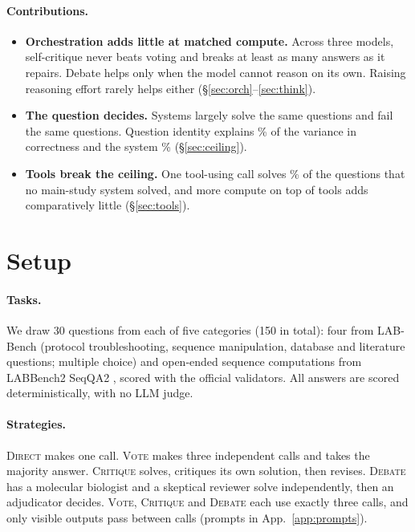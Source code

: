 \documentclass{article}
\newcommand{\vote}{\textsc{Vote}}
\newcommand{\critique}{\textsc{Critique}}
\newcommand{\debate}{\textsc{Debate}}
\newcommand{\direct}{\textsc{Direct}}
\begin{document}
\paragraph{Contributions.}
\begin{itemize}
\setlength\itemsep{0pt}
\item \textbf{Orchestration adds little at matched compute.} Across three models, self-critique never beats voting and breaks at least as many answers as it repairs. Debate helps only when the model cannot reason on its own. Raising reasoning effort rarely helps either (\S\ref{sec:orch}--\ref{sec:think}).
\item \textbf{The question decides.} Systems largely solve the same questions and fail the same questions. Question identity explains \ItemShareMain\% of the variance in correctness and the system \ArmShareMain\% (\S\ref{sec:ceiling}).
\item \textbf{Tools break the ceiling.} One tool-using call solves \ToolsYesUnsolved\% of the questions that no main-study system solved, and more compute on top of tools adds comparatively little (\S\ref{sec:tools}).
\end{itemize}

\section{Setup}
\paragraph{Tasks.}
We draw 30 questions from each of five categories (150 in total): four from LAB-Bench \citep{laurent2024labbench} (protocol troubleshooting, sequence manipulation, database and literature questions; multiple choice) and open-ended sequence computations from LABBench2 SeqQA2 \citep{labbench2}, scored with the official validators.
All answers are scored deterministically, with no LLM judge.

\paragraph{Strategies.}
\direct{} makes one call.
\vote{} makes three independent calls and takes the majority answer.
\critique{} solves, critiques its own solution, then revises.
\debate{} has a molecular biologist and a skeptical reviewer solve independently, then an adjudicator decides.
\vote{}, \critique{} and \debate{} each use exactly three calls, and only visible outputs pass between calls (prompts in App.~\ref{app:prompts}).
\end{document}
